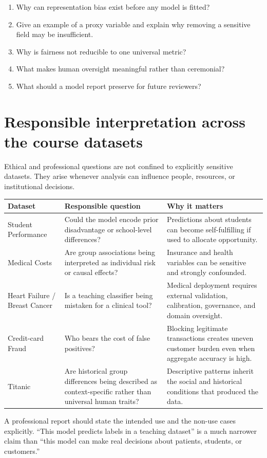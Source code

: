 \begin{quickcheck}
\begin{enumerate}
  \item Why can representation bias exist before any model is fitted?
  \item Give an example of a proxy variable and explain why removing a sensitive field may be insufficient.
  \item Why is fairness not reducible to one universal metric?
  \item What makes human oversight meaningful rather than ceremonial?
  \item What should a model report preserve for future reviewers?
\end{enumerate}
\end{quickcheck}

\section{Responsible interpretation across the course datasets}

Ethical and professional questions are not confined to explicitly sensitive datasets. They arise whenever analysis can influence people, resources, or institutional decisions.

\begin{dstable}
\footnotesize
\begin{tabularx}{\linewidth}{@{}D{3.3cm}D{4.2cm}Y@{}}
\toprule
{}
\textbf{Dataset} & \textbf{Responsible question} & \textbf{Why it matters} \\
\midrule
Student Performance & Could the model encode prior disadvantage or school-level differences? & Predictions about students can become self-fulfilling if used to allocate opportunity. \\
Medical Costs & Are group associations being interpreted as individual risk or causal effects? & Insurance and health variables can be sensitive and strongly confounded. \\
Heart Failure / Breast Cancer & Is a teaching classifier being mistaken for a clinical tool? & Medical deployment requires external validation, calibration, governance, and domain oversight. \\
Credit-card Fraud & Who bears the cost of false positives? & Blocking legitimate transactions creates uneven customer burden even when aggregate accuracy is high. \\
Titanic & Are historical group differences being described as context-specific rather than universal human traits? & Descriptive patterns inherit the social and historical conditions that produced the data. \\
\bottomrule
\end{tabularx}
\end{dstable}

A professional report should state the intended use and the non-use cases explicitly. ``This model predicts labels in a teaching dataset'' is a much narrower claim than ``this model can make real decisions about patients, students, or customers.''
